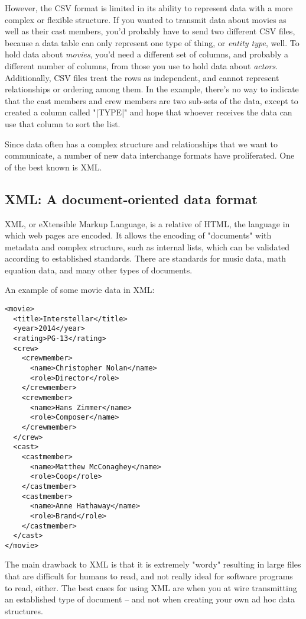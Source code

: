 \documentclass[11pt]{book}
\newcommand{\term}[1]{\emph{#1}} %
\begin{document}
However, the CSV format is limited in its ability to represent data with a more complex or flexible structure.  If you wanted to transmit data about movies as well as their cast members, you'd probably have to send two different CSV files, because a data table can only represent one type of thing, or \term{entity type}, well.  To hold data about \emph{movies}, you'd need a different set of columns, and probably a different number of columns, from those you use to hold data about \emph{actors}.  Additionally, CSV files treat the rows as independent, and cannot represent relationships or ordering among them.  In the example, there's no way to indicate that the cast members and crew members are two sub-sets of the data, except to created a column called "|TYPE|" and hope that whoever receives the data can use that column to sort the list.

Since data often has a complex structure and relationships that we want to communicate, a number of new data interchange formats have proliferated.  One of the best known is XML.

\subsection{XML: A document-oriented data format}

XML, or eXtensible Markup Language, is a relative of HTML, the language in which web pages are encoded.  It allows the encoding of "documents" with metadata and complex structure, such as internal lists, which can be validated according to established standards.  There are standards for music data, math equation data, and many other types of documents.

An example of some movie data in XML:

\begin{verbatim}
<movie>
  <title>Interstellar</title>
  <year>2014</year>
  <rating>PG-13</rating>
  <crew>
    <crewmember>
      <name>Christopher Nolan</name>
      <role>Director</role>
    </crewmember>
    <crewmember>
      <name>Hans Zimmer</name>
      <role>Composer</name>
    </crewmember>
  </crew>
  <cast>
    <castmember>
      <name>Matthew McConaghey</name>
      <role>Coop</role>
    </castmember>
    <castmember>
      <name>Anne Hathaway</name>
      <role>Brand</role>
    </castmember>
  </cast>
</movie>
\end{verbatim}

The main drawback to XML is that it is extremely "wordy" resulting in large files that are difficult for humans to read, and not really ideal for software programs to read, either.  The best cases for using XML are when you at wire transmitting an established type of document -- and not when creating your own ad hoc data structures.
\end{document}
